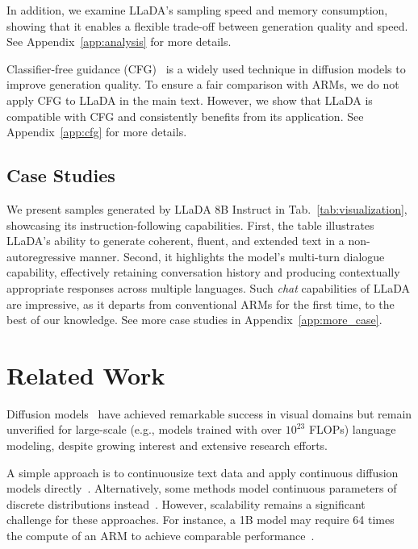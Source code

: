 \documentclass{article}
\begin{document}
In addition, we examine LLaDA’s sampling speed and memory consumption, showing that it enables a flexible trade-off between generation quality and speed. See Appendix~\ref{app:analysis} for more details.

Classifier-free guidance (CFG)~\citep{ho2022classifier,nie2024scaling} is a widely used technique in diffusion models to improve generation quality. To ensure a fair comparison with ARMs, we do not apply CFG to LLaDA in the main text. However, we show that LLaDA is compatible with CFG and consistently benefits from its application. See Appendix~\ref{app:cfg} for more details.


\subsection{Case Studies}
\label{sec:case}

We present samples generated by LLaDA 8B Instruct in Tab.~\ref{tab:visualization}, showcasing its instruction-following capabilities. First, the table illustrates LLaDA’s ability to generate coherent, fluent, and extended text in a non-autoregressive manner. Second, it highlights the model’s multi-turn dialogue capability, effectively retaining conversation history and producing contextually appropriate responses across multiple languages. Such \emph{chat} capabilities of LLaDA are impressive, as it departs from conventional ARMs for the first time, to the best of our knowledge.
See more case studies in Appendix~\ref{app:more_case}. 


\section{Related Work} 
Diffusion models~\citep{sohl2015deep,ho2020denoising,song2020score} have achieved remarkable success in visual domains but remain unverified for large-scale (e.g., models trained with over $10^{23}$ FLOPs)  language modeling, despite growing interest and extensive research efforts.

A simple approach is to continuousize text data and apply continuous diffusion models directly~\citep{li2022diffusion,gong2022diffuseq,han2022ssd,strudel2022self,chen2022analog,dieleman2022continuous,richemond2022categorical,wu2023ardiffusion,mahabadi2024tess,ye2023dinoiser,zhang2023planner}. Alternatively, some methods model continuous parameters of discrete distributions instead~\citep{lou2023reflected,graves2023bayesian,lin2023text,xue2024unifying, zhang2025target}. However, scalability remains a significant challenge for these approaches. For instance, a 1B model may require 64 times the compute of an ARM to achieve comparable performance~\citep{gulrajani2024likelihood}.
\end{document}
